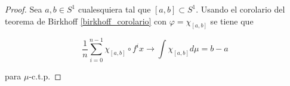 \begin{proof}
	Sea $a,b \in S^1$ cualesquiera tal que $[a,b] \subset S^1$. Usando el corolario del teorema de Birkhoff \ref{birkhoff_corolario} con $\varphi = \chi_{[a,b]}$ se tiene que
	
	\begin{equation}
		\frac{1}{n} \sum_{i=0}^{n-1} \chi_{[a,b]} \circ f^i x \rightarrow \int \chi_{[a,b]} d\mu = b-a
	\end{equation}
	
	para $\mu$-c.t.p.
\end{proof}